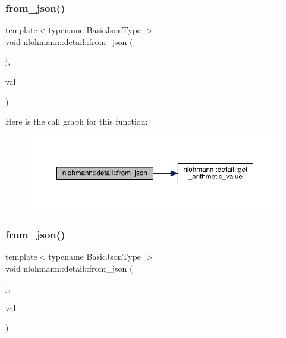 \subsubsection{\texorpdfstring{from\_json()}{from\_json()}\hspace{0.1cm}{\footnotesize\ttfamily [4/11]}}
{\footnotesize\ttfamily template$<$typename Basic\+Json\+Type $>$ \\
void nlohmann\+::detail\+::from\+\_\+json (\begin{DoxyParamCaption}\item[{const Basic\+Json\+Type \&}]{j,  }\item[{typename Basic\+Json\+Type\+::number\+\_\+unsigned\+\_\+t \&}]{val }\end{DoxyParamCaption})}

Here is the call graph for this function\+:
\nopagebreak
\begin{figure}[H]
\begin{center}
\leavevmode
\includegraphics[width=350pt]{namespacenlohmann_1_1detail_ace4d5680ba413d9fd897ccb5d9c61a1c_cgraph}
\end{center}
\end{figure}
\mbox{\label{namespacenlohmann_1_1detail_a047d881e611fcac709dc318f730a1732}} 
\subsubsection{\texorpdfstring{from\_json()}{from\_json()}\hspace{0.1cm}{\footnotesize\ttfamily [5/11]}}
{\footnotesize\ttfamily template$<$typename Basic\+Json\+Type $>$ \\
void nlohmann\+::detail\+::from\+\_\+json (\begin{DoxyParamCaption}\item[{const Basic\+Json\+Type \&}]{j,  }\item[{typename Basic\+Json\+Type\+::number\+\_\+integer\+\_\+t \&}]{val }\end{DoxyParamCaption})}

